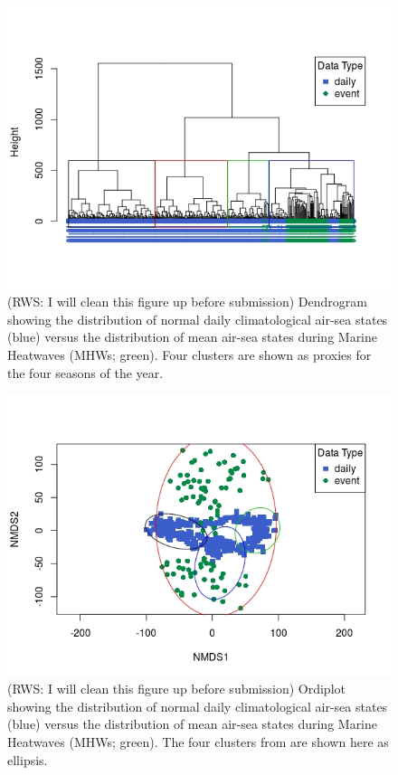 \documentclass[a4paper,10pt,review]{elsarticle}
\begin{document}
\begin{figure}
\includegraphics[width=1.0\textwidth]{figure_6.jpeg}
\caption{(RWS: I will clean this figure up before submission) Dendrogram showing the distribution of normal daily climatological air-sea states (blue) versus the distribution of mean air-sea states during Marine Heatwaves (MHWs; green). Four clusters are shown as proxies for the four seasons of the year.}
\label{figure6}
\end{figure}

\begin{figure}
\includegraphics[width=1.0\textwidth]{figure_7.jpeg}
\caption{(RWS: I will clean this figure up before submission) Ordiplot showing the distribution of normal daily climatological air-sea states (blue) versus the distribution of mean air-sea states during Marine Heatwaves (MHWs; green). The four clusters from  are shown here as ellipsis.}
\label{figure7}
\end{figure}
\end{document}

